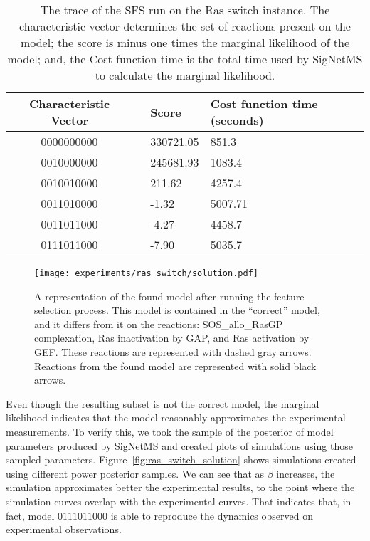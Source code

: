 \begin{table}[H]
\centering
\begin{tabular}{c|cll}
\hline
Characteristic Vector && \multicolumn{1}{l}{Score} &
\multicolumn{1}{l}{Cost function time (seconds)} \\
\hline
    0000000000 && 330721.05	& 851.3	    \\
    0010000000 && 245681.93	& 1083.4	\\
    0010010000 && 211.62	& 4257.4	\\
    0011010000 && -1.32	    & 5007.71	\\
    0011011000 && -4.27	    & 4458.7	\\  
    0111011000 && -7.90	    & 5035.7	\\  
\hline
\hline
\end{tabular}
\caption{The trace of the SFS run on the Ras switch instance. The
    characteristic vector determines the set of reactions present on the
    model; the score is minus one times the marginal likelihood of
    the model; and, the Cost function time is the total time used by 
    SigNetMS to calculate the marginal likelihood.}
\label{tab:sfs_trace}
\end{table}

\begin{figure}[H]
\begin{center}
\texttt{[image: experiments/ras\_switch/solution.pdf]}
\caption{A representation of the found model after running the feature
    selection process. This model is contained in the ``correct'' model,
    and it differs from it on the reactions: SOS\_allo\_RasGP
    complexation, Ras inactivation by GAP, and Ras activation by GEF.
    These reactions are represented with dashed gray arrows. Reactions
    from the found model are represented with solid black arrows.
}
\label{fig:ras_switch:found_model}
\end{center}
\end{figure}

Even though the resulting subset is not the correct model, the marginal
likelihood indicates that the model reasonably approximates the
experimental measurements. To verify this, we took the sample of the
posterior of model parameters produced by SigNetMS and created plots of 
simulations using those sampled parameters.
Figure~\ref{fig:ras_switch_solution} shows simulations created using
different power posterior samples. We can see that as $\beta$ increases,
the simulation approximates better the experimental results, to the
point where the simulation curves overlap with the experimental curves.
That indicates that, in fact, model $0111011000$ is able to reproduce
the dynamics observed on experimental observations.

